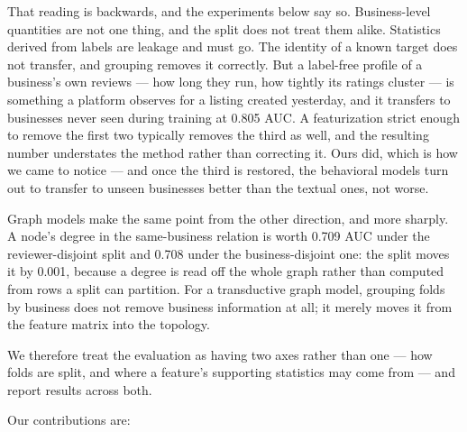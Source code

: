 \documentclass[conference]{IEEEtran}
\begin{document}
That reading is backwards, and the experiments below say so. Business-level
quantities are not one thing, and the split does not treat them alike. Statistics derived from labels are leakage and
must go. The identity of a known target does not transfer, and grouping removes
it correctly. But a label-free profile of a business's own reviews --- how long
they run, how tightly its ratings cluster --- is something a platform observes
for a listing created yesterday, and it transfers to businesses never seen
during training at 0.805 AUC. A featurization strict enough to remove the first
two typically removes the third as well, and the resulting number understates
the method rather than correcting it. Ours did, which is how we came to notice
--- and once the third is restored, the behavioral models turn out to transfer
to unseen businesses better than the textual ones, not worse.

Graph models make the same point from the other direction, and more sharply. A
node's degree in the same-business relation is worth 0.709 AUC under the
reviewer-disjoint split and 0.708 under the business-disjoint one: the split
moves it by 0.001, because a degree is read off the whole graph rather than
computed from rows a split can partition. For a transductive graph model,
grouping folds by business does not remove business information at all; it
merely moves it from the feature matrix into the topology.

We therefore treat the evaluation as having two axes rather than one --- how
folds are split, and where a feature's supporting statistics may come from ---
and report results across both.

Our contributions are:
\end{document}
